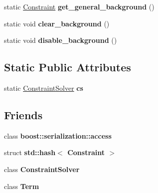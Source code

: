 \begin{DoxyCompactItemize}
\item 
\hypertarget{classConstraint_a81da58b478cfc08940c997dddc7eed05}{static \hyperlink{classConstraint}{\-Constraint} {\bfseries get\-\_\-general\-\_\-background} ()}\label{classConstraint_a81da58b478cfc08940c997dddc7eed05}

\item 
\hypertarget{classConstraint_a40edd25142685c6b70b4ef1b829428b3}{static void {\bfseries clear\-\_\-background} ()}\label{classConstraint_a40edd25142685c6b70b4ef1b829428b3}

\item 
\hypertarget{classConstraint_a46b127b22500a32d9016a21a0c7c523c}{static void {\bfseries disable\-\_\-background} ()}\label{classConstraint_a46b127b22500a32d9016a21a0c7c523c}

\end{DoxyCompactItemize}
\subsection*{\-Static \-Public \-Attributes}
\begin{DoxyCompactItemize}
\item 
\hypertarget{classConstraint_ae55d1e2b3842e37c7125abf5d9fb03db}{static \hyperlink{classConstraintSolver}{\-Constraint\-Solver} {\bfseries cs}}\label{classConstraint_ae55d1e2b3842e37c7125abf5d9fb03db}

\end{DoxyCompactItemize}
\subsection*{\-Friends}
\begin{DoxyCompactItemize}
\item 
\hypertarget{classConstraint_ac98d07dd8f7b70e16ccb9a01abf56b9c}{class {\bfseries boost\-::serialization\-::access}}\label{classConstraint_ac98d07dd8f7b70e16ccb9a01abf56b9c}

\item 
\hypertarget{classConstraint_a5c4db00ea43b0e1ba711f807f6ddafc7}{struct {\bfseries std\-::hash$<$ Constraint $>$}}\label{classConstraint_a5c4db00ea43b0e1ba711f807f6ddafc7}

\item 
\hypertarget{classConstraint_a9604aeb393ba731519e459cdd02b09ff}{class {\bfseries \-Constraint\-Solver}}\label{classConstraint_a9604aeb393ba731519e459cdd02b09ff}

\item 
\hypertarget{classConstraint_a93def3190d5eacce69517079e5886ec2}{class {\bfseries \-Term}}\label{classConstraint_a93def3190d5eacce69517079e5886ec2}

\end{DoxyCompactItemize}



